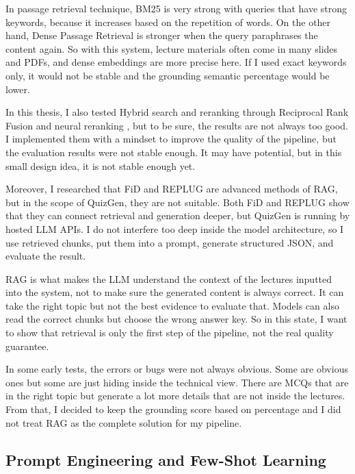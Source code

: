 \documentclass[12pt,a4paper]{article}
\begin{document}
In passage retrieval technique, BM25 \cite{robertson2009bm25} is very strong
with queries that have strong keywords, because it increases based on the
repetition of words. On the other hand, Dense Passage Retrieval
\cite{karpukhin2020dpr} is stronger when the query paraphrases the content
again. So with this system, lecture materials often come in many slides and
PDFs, and dense embeddings are more precise here. If I used exact keywords
only, it would not be stable and the grounding semantic percentage would be
lower.

In this thesis, I also tested Hybrid search and reranking through Reciprocal
Rank Fusion \cite{cormack2009rrf} and neural reranking
\cite{nogueira2019bert}, but to be sure, the results are not always too
good. I implemented them with a mindset to improve the quality of the
pipeline, but the evaluation results were not stable enough. It may have
potential, but in this small design idea, it is not stable enough yet.

Moreover, I researched that FiD \cite{izacard2021fid} and REPLUG
\cite{shi2023replug} are advanced methods of RAG, but in the scope of
QuizGen, they are not suitable. Both FiD and REPLUG show that they can
connect retrieval and generation deeper, but QuizGen is running by hosted
LLM APIs. I do not interfere too deep inside the model architecture, so I use
retrieved chunks, put them into a prompt, generate structured JSON, and
evaluate the result.

RAG is what makes the LLM understand the context of the lectures inputted
into the system, not to make sure the generated content is always correct.
It can take the right topic but not the best evidence to evaluate that.
Models can also read the correct chunks but choose the wrong answer key. So
in this state, I want to show that retrieval is only the first step of the
pipeline, not the real quality guarantee.

In some early tests, the errors or bugs were not always obvious. Some are
obvious ones but some are just hiding inside the technical view. There are
MCQs that are in the right topic but generate a lot more details that are
not inside the lectures. From that, I decided to keep the grounding score
based on percentage and I did not treat RAG as the complete solution for my
pipeline.

\subsection{Prompt Engineering and Few-Shot Learning}
\end{document}
